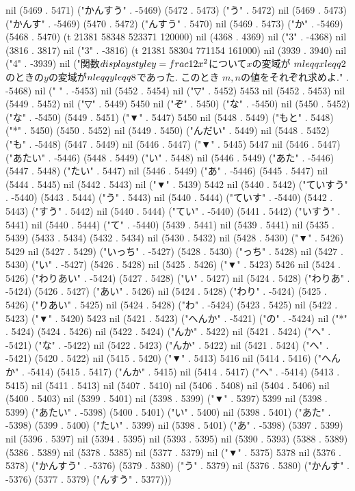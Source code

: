 nil (5469 . 5471) ("かんすう" . -5469) (5472 . 5473) ("う" . 5472) nil (5469 . 5473) ("かんす" . -5469) (5470 . 5472) ("んすう" . 5470) nil (5469 . 5473) ("か" . -5469) (5468 . 5470) (t 21381 58348 523371 120000) nil (4368 . 4369) nil ("3" . -4368) nil (3816 . 3817) nil ("3" . -3816) (t 21381 58304 771154 161000) nil (3939 . 3940) nil ("4" . -3939) nil ("関数$\\displaystyle y=\\frac{1}{2}x^{2}$について$x$の変域が
$m\\leqq x\\leqq 2$のときの$y$の変域が$n\\leqq y\\leqq 8$であった. このとき
$m, n$の値をそれぞれ求めよ." . -5468) nil (" " . -5453) nil (5452 . 5454) nil ("▽" . 5452) 5453 nil (5452 . 5453) nil (5449 . 5452) nil ("▽" . 5449) 5450 nil ("ぞ" . 5450) ("な" . -5450) nil (5450 . 5452) ("な" . -5450) (5449 . 5451) ("▼" . 5447) 5450 nil (5448 . 5449) ("もと" . 5448) ("*" . 5450) (5450 . 5452) nil (5449 . 5450) ("んだい" . 5449) nil (5448 . 5452) ("も" . -5448) (5447 . 5449) nil (5446 . 5447) ("▼" . 5445) 5447 nil (5446 . 5447) ("あたい" . -5446) (5448 . 5449) ("い" . 5448) nil (5446 . 5449) ("あた" . -5446) (5447 . 5448) ("たい" . 5447) nil (5446 . 5449) ("あ" . -5446) (5445 . 5447) nil (5444 . 5445) nil (5442 . 5443) nil ("▼" . 5439) 5442 nil (5440 . 5442) ("ていすう" . -5440) (5443 . 5444) ("う" . 5443) nil (5440 . 5444) ("ていす" . -5440) (5442 . 5443) ("すう" . 5442) nil (5440 . 5444) ("てい" . -5440) (5441 . 5442) ("いすう" . 5441) nil (5440 . 5444) ("て" . -5440) (5439 . 5441) nil (5439 . 5441) nil (5435 . 5439) (5433 . 5434) (5432 . 5434) nil (5430 . 5432) nil (5428 . 5430) ("▼" . 5426) 5429 nil (5427 . 5429) ("いっち" . -5427) (5428 . 5430) ("っち" . 5428) nil (5427 . 5430) ("い" . -5427) (5426 . 5428) nil (5425 . 5426) ("▼" . 5423) 5426 nil (5424 . 5426) ("わりあい" . -5424) (5427 . 5428) ("い" . 5427) nil (5424 . 5428) ("わりあ" . -5424) (5426 . 5427) ("あい" . 5426) nil (5424 . 5428) ("わり" . -5424) (5425 . 5426) ("りあい" . 5425) nil (5424 . 5428) ("わ" . -5424) (5423 . 5425) nil (5422 . 5423) ("▼" . 5420) 5423 nil (5421 . 5423) ("へんか" . -5421) ("の" . -5424) nil ("*" . 5424) (5424 . 5426) nil (5422 . 5424) ("んか" . 5422) nil (5421 . 5424) ("へ" . -5421) ("な" . -5422) nil (5422 . 5423) ("んか" . 5422) nil (5421 . 5424) ("へ" . -5421) (5420 . 5422) nil (5415 . 5420) ("▼" . 5413) 5416 nil (5414 . 5416) ("へんか" . -5414) (5415 . 5417) ("んか" . 5415) nil (5414 . 5417) ("へ" . -5414) (5413 . 5415) nil (5411 . 5413) nil (5407 . 5410) nil (5406 . 5408) nil (5404 . 5406) nil (5400 . 5403) nil (5399 . 5401) nil (5398 . 5399) ("▼" . 5397) 5399 nil (5398 . 5399) ("あたい" . -5398) (5400 . 5401) ("い" . 5400) nil (5398 . 5401) ("あた" . -5398) (5399 . 5400) ("たい" . 5399) nil (5398 . 5401) ("あ" . -5398) (5397 . 5399) nil (5396 . 5397) nil (5394 . 5395) nil (5393 . 5395) nil (5390 . 5393) (5388 . 5389) (5386 . 5389) nil (5378 . 5385) nil (5377 . 5379) nil ("▼" . 5375) 5378 nil (5376 . 5378) ("かんすう" . -5376) (5379 . 5380) ("う" . 5379) nil (5376 . 5380) ("かんす" . -5376) (5377 . 5379) ("んすう" . 5377)))

